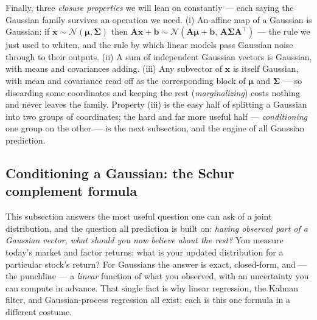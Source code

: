\documentclass[11pt]{article}
\numberwithin{equation}{section}
\theoremstyle{plain}
\theoremstyle{definition}
\theoremstyle{remark}
\newcommand{\Normal}{\mathcal{N}}
\newcommand{\x}{\bm{x}}
\newcommand{\bmu}{\bm{\mu}}
\newcommand{\bSigma}{\bm{\Sigma}}
\newcommand{\T}{\top}
\begin{document}
Finally, three \emph{closure properties} we will lean on constantly --- each saying the Gaussian family survives an operation we need. (i) An affine map of a Gaussian is Gaussian: if $\x \sim \Normal(\bmu, \bSigma)$ then $\bm{A}\x + \bm{b} \sim \Normal(\bm{A}\bmu + \bm{b},\, \bm{A}\bSigma\bm{A}^\T)$ --- the rule we just used to whiten, and the rule by which linear models pass Gaussian noise through to their outputs. (ii) A sum of independent Gaussian vectors is Gaussian, with means and covariances adding. (iii) Any subvector of $\x$ is itself Gaussian, with mean and covariance read off as the corresponding block of $\bmu$ and $\bSigma$ --- so discarding some coordinates and keeping the rest (\emph{marginalizing}) costs nothing and never leaves the family. Property (iii) is the easy half of splitting a Gaussian into two groups of coordinates; the hard and far more useful half --- \emph{conditioning} one group on the other --- is the next subsection, and the engine of all Gaussian prediction.

\subsection{Conditioning a Gaussian: the Schur complement formula}\label{sec:gausscond}

This subsection answers the most useful question one can ask of a joint distribution, and the question all prediction is built on: \emph{having observed part of a Gaussian vector, what should you now believe about the rest?} You measure today's market and factor returns; what is your updated distribution for a particular stock's return? For Gaussians the answer is exact, closed-form, and --- the punchline --- a \emph{linear} function of what you observed, with an uncertainty you can compute in advance. That single fact is why linear regression, the Kalman filter, and Gaussian-process regression all exist: each is this one formula in a different costume.
\end{document}
